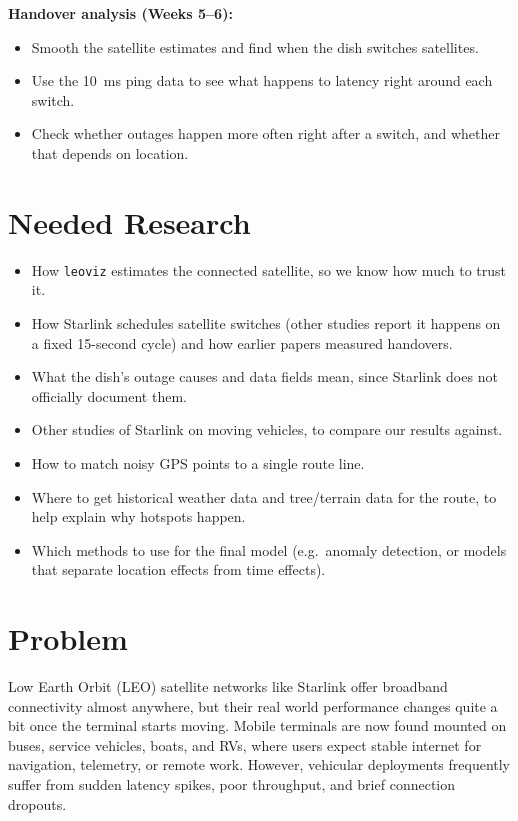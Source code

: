 \documentclass{article}
\begin{document}
\textbf{Handover analysis (Weeks 5--6):}
\begin{itemize}
    \item Smooth the satellite estimates and find when the dish switches satellites.
    \item Use the 10~ms ping data to see what happens to latency right around each switch.
    \item Check whether outages happen more often right after a switch, and whether that depends on location.
\end{itemize}

\section{Needed Research}

\begin{itemize}
    \item How \texttt{leoviz} estimates the connected satellite, so we know how much to trust it.
    \item How Starlink schedules satellite switches (other studies report it happens on a fixed 15-second cycle) and how earlier papers measured handovers.
    \item What the dish's outage causes and data fields mean, since Starlink does not officially document them.
    \item Other studies of Starlink on moving vehicles, to compare our results against.
    \item How to match noisy GPS points to a single route line.
    \item Where to get historical weather data and tree/terrain data for the route, to help explain why hotspots happen.
    \item Which methods to use for the final model (e.g.\ anomaly detection, or models that separate location effects from time effects).
\end{itemize}

\section{Problem}
\label{sec:problem}
Low Earth Orbit (LEO) satellite networks like Starlink offer broadband connectivity almost anywhere, but their real world performance changes quite a bit once the terminal starts moving. Mobile terminals are now found mounted on buses, service vehicles, boats, and RVs, where users expect stable internet for navigation, telemetry, or remote work. However, vehicular deployments frequently suffer from sudden latency spikes, poor throughput, and brief connection dropouts.
\end{document}
